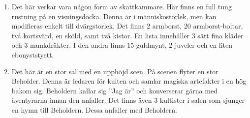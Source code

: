 \begin{enumerate}
	\item Det här verkar vara någon form av skattkammare. Här finns en full tung rustning på en visningsdocka. Denna är i människostorlek, men kan modifieras enkelt till dvärgstorlek. Det finns 2 armborst, 20 armborst-boltar, två kortsvärd, en sköld, samt två kistor. En lista innehåller 3 sätt fina kläder och 3 munkdräkter. I den andra finns 15 guldmynt, 2 juveler och en liten ebonyststyett. 
	\item Det här är en stor sal med en upphöjd scen. På scenen flyter en stor Beholder. Denna är ledaren för kulten och samlar magiska artefakter i en hög bakom sig. Beholdern kallar sig ”Jag är” och konverserar gärna med äventyrarna innan den anfaller. Det finns även 3 kultister i salen som sjunger en hymn till Beholdern. Dessa anfaller med Beholdern.
\end{enumerate}
